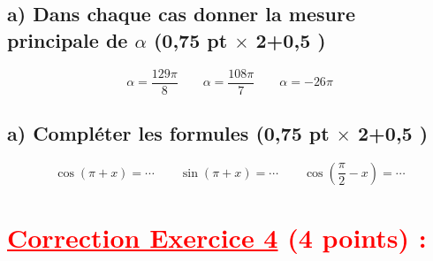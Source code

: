 \documentclass[12pt]{article}
\begin{document}
\subsection*{a) Dans chaque cas donner la mesure principale de $\alpha$ (0,75 pt $\times$ 2+0,5 )}
\[\alpha =\frac{129\pi}{8}\quad\quad \alpha =\frac{108\pi}{7}\quad\quad \alpha = -26\pi \]
\subsection*{a) Compléter les formules (0,75 pt $\times$ 2+0,5 )}
\[\cos(\pi+x)=\cdots\quad\quad \sin(\pi+x)=\cdots\quad\quad \cos(\frac{\pi}{2}-x)=\cdots\]
\section*{\textcolor{red}{\underline{Correction Exercice 4} (4 points) :}}
\end{document}
